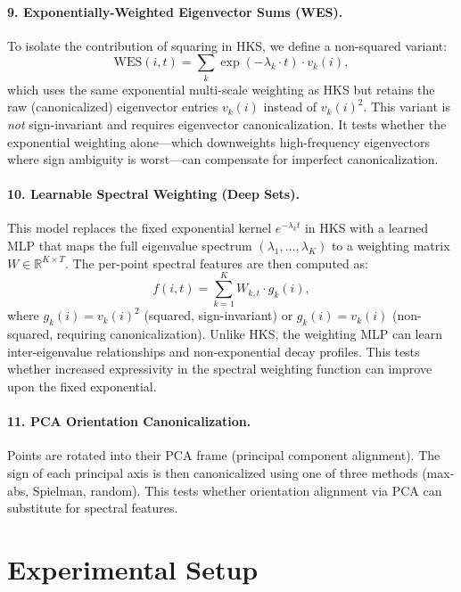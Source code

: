 \documentclass[11pt]{article}
\begin{document}
\paragraph{9. Exponentially-Weighted Eigenvector Sums (WES).}
To isolate the contribution of squaring in HKS, we define a non-squared variant:
\[
    \text{WES}(i, t) = \sum_k \exp(-\lambda_k \cdot t) \cdot v_k(i),
\]
which uses the same exponential multi-scale weighting as HKS but retains the raw
(canonicalized) eigenvector entries $v_k(i)$ instead of $v_k(i)^2$. This variant is
\emph{not} sign-invariant and requires eigenvector canonicalization. It tests whether the
exponential weighting alone---which downweights high-frequency eigenvectors where sign
ambiguity is worst---can compensate for imperfect canonicalization.

\paragraph{10. Learnable Spectral Weighting (Deep Sets).}
This model replaces the fixed exponential kernel $e^{-\lambda_k t}$ in HKS with a learned MLP
that maps the full eigenvalue spectrum $(\lambda_1, \ldots, \lambda_K)$ to a weighting matrix
$W \in \mathbb{R}^{K \times T}$. The per-point spectral features are then computed as:
\[
    f(i, t) = \sum_{k=1}^{K} W_{k,t} \cdot g_k(i),
\]
where $g_k(i) = v_k(i)^2$ (squared, sign-invariant) or $g_k(i) = v_k(i)$ (non-squared,
requiring canonicalization). Unlike HKS, the weighting MLP can learn inter-eigenvalue
relationships and non-exponential decay profiles. This tests whether increased expressivity
in the spectral weighting function can improve upon the fixed exponential.

\paragraph{11. PCA Orientation Canonicalization.}
Points are rotated into their PCA frame (principal component alignment). The sign of each
principal axis is then canonicalized using one of three methods (max-abs, Spielman, random).
This tests whether orientation alignment via PCA can substitute for spectral features.

\section{Experimental Setup}
\end{document}
